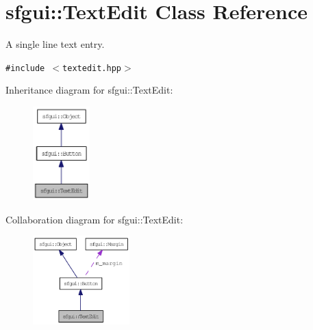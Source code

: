 \hypertarget{classsfgui_1_1TextEdit}{
\section{sfgui::TextEdit Class Reference}
\label{classsfgui_1_1TextEdit}
}
A single line text entry.  


{\tt \#include $<$textedit.hpp$>$}

Inheritance diagram for sfgui::TextEdit:\nopagebreak
\begin{figure}[H]
\begin{center}
\leavevmode
\includegraphics[width=62pt]{classsfgui_1_1TextEdit__inherit__graph}
\end{center}
\end{figure}
Collaboration diagram for sfgui::TextEdit:\nopagebreak
\begin{figure}[H]
\begin{center}
\leavevmode
\includegraphics[width=106pt]{classsfgui_1_1TextEdit__coll__graph}
\end{center}
\end{figure}
